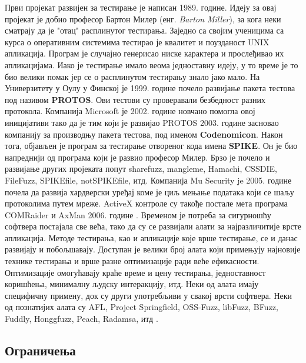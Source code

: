 \documentclass[12pt,oneside]{memoir}
\begin{document}
Први пројекат развијен за тестирање је написан 1989. године. Идеју за овај пројекат је добио професор Бартон Милер (енг. \textit{Barton Miller}), за кога неки сматрају да је "отац" расплинутог тестирања. Заједно са својим ученицима са курса о оперативним системима тестирао је квалитет и поузданост UNIX апликација. Програм је случајно генерисао ниске карактера и прослеђивао их апликацијама. Иако је тестирање имало веома једноставну идеју, у то време је то био велики помак јер се о расплинутом тестирању знало јако мало. На Универзитету у Оулу у Финској је 1999. године почело развијање пакета тестова под називом \textbf{PROTOS}. Ови тестови су проверавали безбедност разних протокола. Компанија Microsoft је 2002. године новчано помогла овој иницијативи тако да је тим који је развијао PROTOS 2003. године засновао компанију за производњу пакета тестова, под именом \textbf{Codenomicon}. Након тога, објављен је програм за тестирање отвореног кода имена \textbf{SPIKE}. Он је био напреднији од програма који је развио професор Милер. Брзо је почело и развијање других пројеката попут sharefuzz, mangleme, Hamachi, CSSDIE, FileFuzz, SPIKEfile, notSPIKEfile, итд. Компанија Mu Security je 2005. године почела да развија хардверски уређај коме је циљ мењање података који се шаљу протоколима путем мреже. ActiveX контроле су такође постале мета програма COMRaider и AxMan 2006. године \cite{fuzzingBrute, fuzzing}. Временом је потреба за сигурношћу софтвера постајала све већа, тако да су се развијали алати за најразличитије врсте апликација. Методе тестирања, као и апликације које врше тестирање, се и данас развијају и побољшавају. Доступан је велики број алата који примењују најновије технике тестирања и врше разне оптимизације ради веће ефикасности. Оптимизације омогућавају краће време и цену тестирања, једноставност коришћења, минималну људску интеракцију, итд. Неки од алата имају специфичну примену, док су други употребљиви у свакој врсти софтвера. Неки од познатијих алата су AFL, Project Springfield, OSS-Fuzz, libFuzz, BFuzz, Fuddly, Honggfuzz, Peach, Radamsa, итд \cite{bestFuzzers, fuzzingBrute, fuzzing}. 

\subsection{Ограничења}
\label{subsec:ogranicenja}
\end{document}
